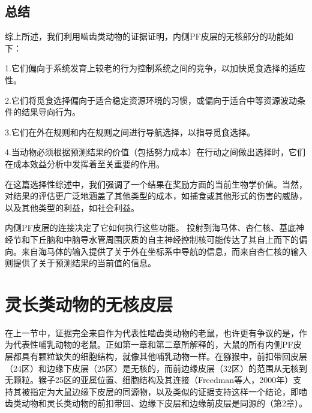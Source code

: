 \subsection{总结}
综上所述，我们利用啮齿类动物的证据证明，内侧PF皮层的无核部分的功能如下：\par
1.它们偏向于系统发育上较老的行为控制系统之间的竞争，以加快觅食选择的适应性。\par
2.它们将觅食选择偏向于适合稳定资源环境的习惯，或偏向于适合中等资源波动条件的结果导向行为。\par
3.它们在外在规则和内在规则之间进行导航选择，以指导觅食选择。\par
4.当动物必须根据预测结果的价值（包括努力成本）在行动之间做出选择时，它们在成本效益分析中发挥着至关重要的作用。\par
在这篇选择性综述中，我们强调了一个结果在奖励方面的当前生物学价值。当然，对结果的评估更广泛地涵盖了其他类型的成本，如捕食或其他形式的伤害的威胁，以及其他类型的利益，如社会利益。\par
内侧PF皮层的连接决定了它如何执行这些功能。
投射到海马体、杏仁核、基底神经节和下丘脑和中脑导水管周围灰质的自主神经控制核可能传达了其自上而下的偏向。来自海马体的输入提供了关于外在坐标系中导航的信息，而来自杏仁核的输入则提供了关于预测结果的当前值的信息。\par
\section{灵长类动物的无核皮层}
在上一节中，证据完全来自作为代表性啮齿类动物的老鼠，也许更有争议的是，作为代表性哺乳动物的老鼠。正如第一章和第二章所解释的，大鼠的所有内侧PF皮层都具有颗粒缺失的细胞结构，就像其他哺乳动物一样。在猕猴中，前扣带回皮层（24区）和边缘下皮层（25区）是无核的，而前边缘皮层（32区）的范围从无核到无颗粒\cite{Vogt&Derbyshire,2009;Mackey&Petrides,2010}。猴子25区的亚属位置、细胞结构及其连接（Freedman等人，2000年）支持其被指定为大鼠边缘下皮层的同源物，以及类似的证据支持这样一个结论，即啮齿类动物和灵长类动物的前扣带回、边缘下皮层和边缘前皮层是同源的（第2章）。\par

